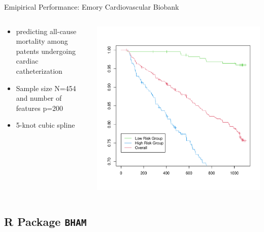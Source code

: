\documentclass[
  ignorenonframetext,
  aspectratio=169]{beamer}
\providecommand{\tightlist}{%
  \setlength{\itemsep}{0pt}\setlength{\parskip}{0pt}}
\begin{document}
\begin{frame}{Emipirical Performance: Emory Cardiovascular Biobank}
\protect\hypertarget{emipirical-performance-emory-cardiovascular-biobank}{}
\begin{columns}[T]
\begin{column}{0.48\textwidth}
\begin{itemize}
\tightlist
\item
  predicting all-cause mortality among patents undergoing cardiac
  catheterization
\item
  Sample size N=454 and number of features p=200
\item
  5-knot cubic spline
\end{itemize}
\end{column}

\begin{column}{0.48\textwidth}
\includegraphics[width=\textwidth,height=0.6\textheight]{ECB_bcam_KM.pdf}
\end{column}
\end{columns}
\end{frame}

\hypertarget{r-package-bham}{%
\subsection{\texorpdfstring{R Package
\texttt{BHAM}}{R Package BHAM}}\label{r-package-bham}}
\end{document}
